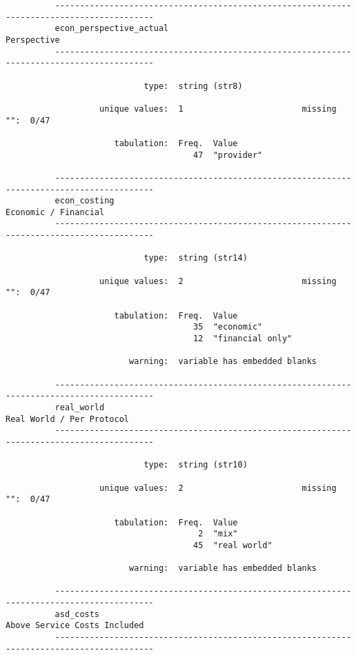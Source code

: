 \documentclass{article}
\begin{document}
\begin{verbatim}
          ------------------------------------------------------------------------------------------
          econ_perspective_actual                                                        Perspective
          ------------------------------------------------------------------------------------------
          
                            type:  string (str8)
          
                   unique values:  1                        missing "":  0/47
          
                      tabulation:  Freq.  Value
                                      47  "provider"
          
          ------------------------------------------------------------------------------------------
          econ_costing                                                          Economic / Financial
          ------------------------------------------------------------------------------------------
          
                            type:  string (str14)
          
                   unique values:  2                        missing "":  0/47
          
                      tabulation:  Freq.  Value
                                      35  "economic"
                                      12  "financial only"
          
                         warning:  variable has embedded blanks
          
          ------------------------------------------------------------------------------------------
          real_world                                                       Real World / Per Protocol
          ------------------------------------------------------------------------------------------
          
                            type:  string (str10)
          
                   unique values:  2                        missing "":  0/47
          
                      tabulation:  Freq.  Value
                                       2  "mix"
                                      45  "real world"
          
                         warning:  variable has embedded blanks
          
          ------------------------------------------------------------------------------------------
          asd_costs                                                     Above Service Costs Included
          ------------------------------------------------------------------------------------------
          

\end{verbatim}
\end{document}
